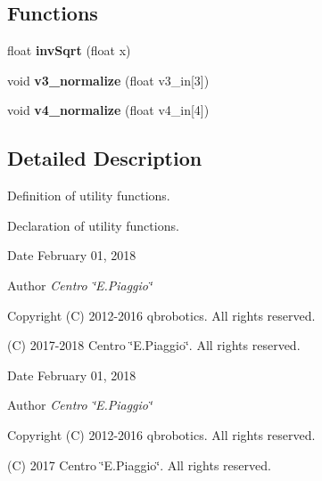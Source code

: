 \subsection*{Functions}
\begin{DoxyCompactItemize}
\item 
\mbox{\label{utils_8h_a5e5346796220b271615a52428f6ec6ca}} 
float {\bfseries inv\+Sqrt} (float x)
\item 
\mbox{\label{utils_8h_a88d150c696b69e576a1dfb193266ae6a}} 
void {\bfseries v3\+\_\+normalize} (float v3\+\_\+in[3])
\item 
\mbox{\label{utils_8h_a2965058da02ba33e26af00cff2fcfec2}} 
void {\bfseries v4\+\_\+normalize} (float v4\+\_\+in[4])
\end{DoxyCompactItemize}


\subsection{Detailed Description}
Definition of utility functions. 

Declaration of utility functions.

\begin{DoxyDate}{Date}
February 01, 2018 
\end{DoxyDate}
\begin{DoxyAuthor}{Author}
{\itshape Centro \char`\"{}\+E.\+Piaggio\char`\"{}} 
\end{DoxyAuthor}
\begin{DoxyCopyright}{Copyright}
(C) 2012-\/2016 qbrobotics. All rights reserved. 

(C) 2017-\/2018 Centro \char`\"{}\+E.\+Piaggio\char`\"{}. All rights reserved.
\end{DoxyCopyright}
\begin{DoxyDate}{Date}
February 01, 2018 
\end{DoxyDate}
\begin{DoxyAuthor}{Author}
{\itshape Centro \char`\"{}\+E.\+Piaggio\char`\"{}} 
\end{DoxyAuthor}
\begin{DoxyCopyright}{Copyright}
(C) 2012-\/2016 qbrobotics. All rights reserved. 

(C) 2017 Centro \char`\"{}\+E.\+Piaggio\char`\"{}. All rights reserved. 
\end{DoxyCopyright}
